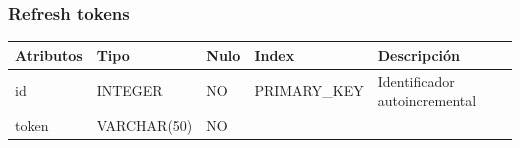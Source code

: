 \documentclass[12pt,a4paperpaper,]{report}
\begin{document}
\subsubsection{Refresh tokens}\label{refresh-tokens}

\begin{longtable}[]{@{}lllll@{}}
\toprule
\begin{minipage}[b]{0.21\columnwidth}\raggedright\strut
Atributos\strut
\end{minipage} & \begin{minipage}[b]{0.19\columnwidth}\raggedright\strut
Tipo\strut
\end{minipage} & \begin{minipage}[b]{0.16\columnwidth}\raggedright\strut
Nulo\strut
\end{minipage} & \begin{minipage}[b]{0.19\columnwidth}\raggedright\strut
Index\strut
\end{minipage} & \begin{minipage}[b]{0.11\columnwidth}\raggedright\strut
Descripción\strut
\end{minipage}\tabularnewline
\midrule
\endhead
\begin{minipage}[t]{0.21\columnwidth}\raggedright\strut
id\strut
\end{minipage} & \begin{minipage}[t]{0.19\columnwidth}\raggedright\strut
INTEGER\strut
\end{minipage} & \begin{minipage}[t]{0.16\columnwidth}\raggedright\strut
NO\strut
\end{minipage} & \begin{minipage}[t]{0.19\columnwidth}\raggedright\strut
PRIMARY\_KEY\strut
\end{minipage} & \begin{minipage}[t]{0.11\columnwidth}\raggedright\strut
Identificador autoincremental\strut
\end{minipage}\tabularnewline
\begin{minipage}[t]{0.21\columnwidth}\raggedright\strut
token\strut
\end{minipage} & \begin{minipage}[t]{0.19\columnwidth}\raggedright\strut
VARCHAR(50)\strut
\end{minipage} & \begin{minipage}[t]{0.16\columnwidth}\raggedright\strut
NO\strut
\end{minipage} & \begin{minipage}[t]{0.19\columnwidth}\raggedright\strut

\end{minipage}
\end{longtable}
\end{document}
